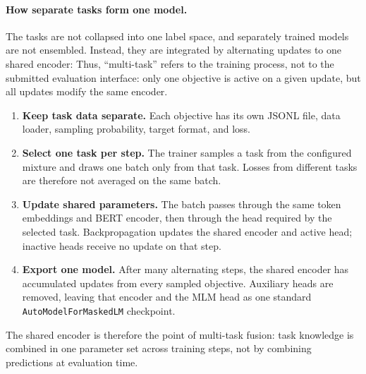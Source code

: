 \documentclass[11pt]{article}
\begin{document}
\paragraph{How separate tasks form one model.}
The tasks are not collapsed into one label space, and separately trained models are not ensembled.
Instead, they are integrated by alternating updates to one shared encoder:
Thus, ``multi-task'' refers to the training process, not to the submitted evaluation interface: only one objective is active on a given update, but all updates modify the same encoder.
\begin{enumerate}
  \setlength{\itemsep}{1pt}
  \setlength{\parsep}{0pt}
  \setlength{\topsep}{2pt}
  \item \textbf{Keep task data separate.} Each objective has its own JSONL file, data loader, sampling probability, target format, and loss.
  \item \textbf{Select one task per step.} The trainer samples a task from the configured mixture and draws one batch only from that task. Losses from different tasks are therefore not averaged on the same batch.
  \item \textbf{Update shared parameters.} The batch passes through the same token embeddings and BERT encoder, then through the head required by the selected task. Backpropagation updates the shared encoder and active head; inactive heads receive no update on that step.
  \item \textbf{Export one model.} After many alternating steps, the shared encoder has accumulated updates from every sampled objective. Auxiliary heads are removed, leaving that encoder and the MLM head as one standard \texttt{AutoModelForMaskedLM} checkpoint.
\end{enumerate}
The shared encoder is therefore the point of multi-task fusion: task knowledge is combined in one parameter set across training steps, not by combining predictions at evaluation time.
\end{document}
